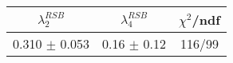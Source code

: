\begin{tabular}{c|c||c}
$\lambda_{2}^{RSB}$ & $\lambda_4^{RSB}$ & $\chi^{2}$/ndf \\
\hline
0.310 $\pm$ 0.053 & 0.16 $\pm$ 0.12 & 116/99\\
\end{tabular}
